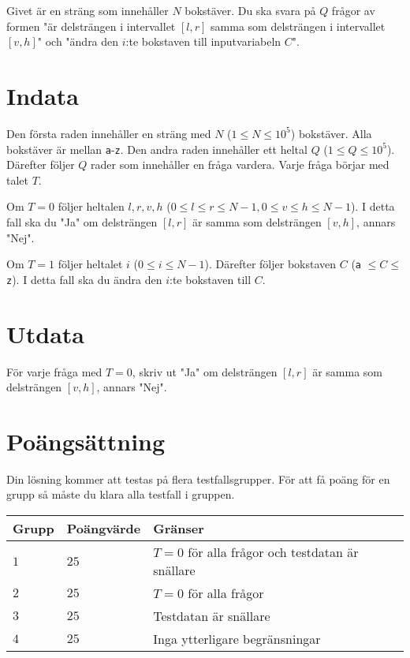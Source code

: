 Givet är en sträng som innehåller $N$ bokstäver. Du ska svara på $Q$ frågor av formen "är delsträngen i
intervallet $[l,r]$ samma som delsträngen i intervallet $[v,h]$" och "ändra den $i$:te bokstaven till inputvariabeln $C$".

\section*{Indata}
Den första raden innehåller en sträng med $N$ ($1 \leq N \leq 10^5$) bokstäver. Alla bokstäver är mellan
\texttt{a}-\texttt{z}.
Den andra raden innehåller ett heltal $Q$ ($1 \leq Q \leq 10^5$).
Därefter följer $Q$ rader som innehåller en fråga vardera. Varje fråga börjar med talet $T$.

Om $T=0$ följer heltalen $l,r,v,h$ ($0 \leq l \leq r \leq N-1, 0 \leq v \leq h \leq N-1$).
I detta fall ska du "Ja" om delsträngen $[l,r]$ är samma som delsträngen $[v,h]$, annars "Nej".

Om $T=1$ följer heltalet $i$ ($0 \leq i \leq N-1$). Därefter följer bokstaven $C$ (\texttt{a} $\leq C \leq$ \texttt{z}). I detta fall ska du ändra den $i$:te bokstaven till $C$. 

\section*{Utdata}
För varje fråga med $T=0$, skriv ut "Ja" om delsträngen $[l,r]$ är samma som delsträngen $[v,h]$, annars "Nej".

\section*{Poängsättning}
Din lösning kommer att testas på flera testfallsgrupper.
\noindent
För att få poäng för en grupp så måste du klara alla testfall i gruppen.

\noindent
\begin{tabular}{| l | l | l |}
\hline
  Grupp & Poängvärde & Gränser \\ \hline
  $1$    & $25$       &  $T=0$ för alla frågor och testdatan är snällare \\ \hline
  $2$    & $25$       &  $T=0$ för alla frågor \\ \hline
  $3$    & $25$       &  Testdatan är snällare \\ \hline
  $4$    & $25$       &  Inga ytterligare begränsningar \\ \hline
\end{tabular}
